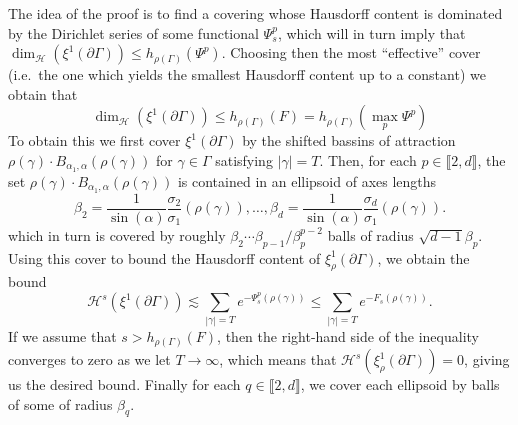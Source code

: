 \documentclass{report}
\begin{document}
The idea of the proof is to find a covering whose Hausdorff content is dominated by the Dirichlet series of some functional $\Psi_s^p$, which will in turn imply that $\dim_{\mathcal H}(\xi^1(\partial \Gamma)) \leq h_{\rho(\Gamma)}(\Psi^p) $.
Choosing then the most ``effective'' cover (i.e.\ the one which yields the smallest Hausdorff content up to a constant) we obtain that
\[
    \dim_{\mathcal H}(\xi^1(\partial \Gamma)) \leq h_{\rho(\Gamma)}(F) = h_{\rho(\Gamma)} \left(\max_p \Psi^p \right)
\]
To obtain this we first cover $\xi^1(\partial \Gamma)$ by the shifted bassins of attraction $\rho(\gamma) \cdot B_{\alpha_1, \alpha} (\rho(\gamma))$ for $\gamma \in \Gamma$ satisfying $|\gamma| = T$.
Then, for each $p \in \llbracket 2, d \rrbracket$, the set $\rho(\gamma) \cdot B_{\alpha_1, \alpha} (\rho(\gamma))$ is contained in an ellipsoid of axes lengths
\[
    \beta_2 = \frac{1}{\sin(\alpha)} \frac{\sigma_2}{\sigma_1}(\rho(\gamma)), \ldots, 
    \beta_d = \frac{1}{\sin(\alpha)} \frac{\sigma_d}{\sigma_1}(\rho(\gamma)).
\]
which in turn is covered by roughly $\beta_2 \cdots \beta_{p-1}/\beta_p^{p-2}$ balls of radius $\sqrt{d-1} \beta_p$.
Using this cover to bound the Hausdorff content of $\xi_\rho^1(\partial \Gamma)$, we obtain the bound
\[
    \mathcal H^s(\xi^1(\partial \Gamma)) \lesssim \sum_{|\gamma| = T} e^{-\Psi_s^p(\rho(\gamma))} \leq \sum_{|\gamma| = T} e^{-F_s(\rho(\gamma))}.
\]
If we assume that $s > h_{\rho(\Gamma)}(F)$, then the right-hand side of the inequality converges to zero as we let $T \to \infty$, which means that $\mathcal H^s(\xi_\rho^1(\partial \Gamma)) = 0$, giving us the desired bound.
Finally for each $q \in \llbracket 2, d \rrbracket$, we cover each ellipsoid by balls of some of radius $\beta_q$.
\end{document}
